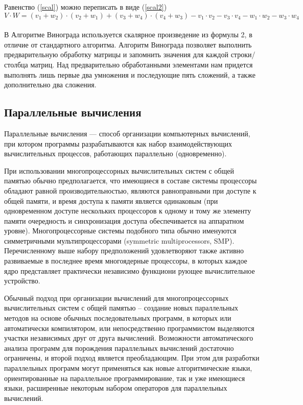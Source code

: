 \documentclass[a4paper, 14pt]{article}
\begin{document}
		    
         Равенство (\ref{scal}) можно переписать в виде (\ref{scal2})\\
         \begin{equation}\label{scal2}
V \cdot W=(v_1 + w_2) \cdot (v_2 + w_1) + (v_3 + w_4) \cdot (v_4 + w_3) - v_1 \cdot v_2 - v_3 \cdot v_4 - w_1 \cdot w_2 - w_3 \cdot w_4
         \end{equation}\\
        В Алгоритме Винограда используется скалярное произведение из формулы 2, в отличие от стандартного алгоритма. Алгоритм Винограда позволяет выполнить предварительную обработку матрицы и запомнить значения для каждой строки/столбца матриц.
Над предварительно обработанными элементами нам придется выполнять лишь первые два умножения и последующие пять сложений, а также
дополнительно два сложения\cite{litlink1}.\\
		
		\subsection{Параллельные вычисления}
		Параллельные вычисления — способ организации компьютерных вычислений, при котором программы разрабатываются как набор взаимодействующих вычислительных процессов, работающих параллельно (одновременно). 
		
		При использовании многопроцессорных вычислительных систем с общей памятью обычно предполагается, что имеющиеся в составе системы процессоры обладают равной производительностью, являются равноправными при доступе к общей памяти, и время доступа к памяти является одинаковым (при одновременном доступе нескольких процессоров к одному и тому же элементу памяти очередность и синхронизация доступа обеспечивается на аппаратном уровне). Многопроцессорные системы подобного типа обычно именуются симметричными мультипроцессорами (symmetric multiprocessors, SMP).\\		
	Перечисленному выше набору предположений удовлетворяют также активно развиваемые в последнее время многоядерные процессоры, в которых каждое ядро представляет практически независимо функциони рующее вычислительное устройство.
	
	Обычный подход при организации вычислений для многопроцессорных вычислительных систем с общей памятью – создание новых параллельных методов на основе обычных последовательных программ, в которых или автоматически компилятором, или непосредственно программистом выделяются участки независимых друг от друга вычислений. Возможности автоматического анализа программ для порождения параллельных вычислений достаточно ограничены, и второй подход является преобладающим. При этом для разработки параллельных программ могут применяться как новые алгоритмические языки, ориентированные на параллельное программирование, так и уже имеющиеся языки, расширенные некоторым набором операторов для параллельных вычислений.
	
\end{document}
